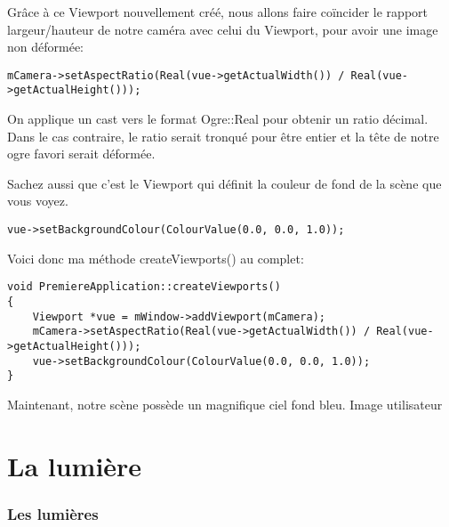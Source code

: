 \documentclass[10pt,a4paper]{report}
\begin{document}
Gr\^{a}ce \`{a} ce Viewport nouvellement cr\'e\'e, nous allons faire co\"incider le rapport largeur/hauteur de notre cam\'era avec celui du Viewport, pour avoir une image non d\'eform\'ee:
\begin{lstlisting}
mCamera->setAspectRatio(Real(vue->getActualWidth()) / Real(vue->getActualHeight()));
\end{lstlisting}

On applique un cast vers le format Ogre::Real pour obtenir un ratio d\'ecimal. Dans le cas contraire, le ratio serait tronqu\'e pour \^etre entier et la t\^ete de notre ogre favori serait d\'eform\'ee.

Sachez aussi que c'est le Viewport qui d\'efinit la couleur de fond de la sc\`ene que vous voyez. 
\begin{lstlisting}
vue->setBackgroundColour(ColourValue(0.0, 0.0, 1.0));
\end{lstlisting}

Voici donc ma m\'ethode createViewports() au complet:
\begin{lstlisting}
void PremiereApplication::createViewports()
{
    Viewport *vue = mWindow->addViewport(mCamera);
    mCamera->setAspectRatio(Real(vue->getActualWidth()) / Real(vue->getActualHeight()));
    vue->setBackgroundColour(ColourValue(0.0, 0.0, 1.0));
}
\end{lstlisting}


Maintenant, notre sc\`ene poss\`ede un magnifique ciel fond bleu.
Image utilisateur


























\part{La lumi\`ere}



\section{Les lumi\`eres}
\end{document}
